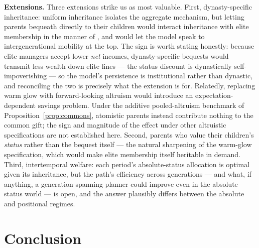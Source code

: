 \documentclass[12pt,letterpaper]{article}
\theoremstyle{definition}
\begin{document}
\textbf{Extensions.}
Three extensions strike us as most valuable.
First, dynasty-specific inheritance: uniform inheritance isolates the aggregate mechanism, but letting parents bequeath directly to their children would interact inheritance with elite membership in the manner of \citet{galorzeira1993}, and would let the model speak to intergenerational mobility at the top.
The sign is worth stating honestly: because elite managers accept lower \emph{net} incomes, dynasty-specific bequests would transmit less wealth down elite lines --- the status discount is dynastically self-impoverishing --- so the model's persistence is institutional rather than dynastic, and reconciling the two is precisely what the extension is for.
Relatedly, replacing warm glow with forward-looking altruism would introduce an expectation-dependent savings problem.
Under the additive pooled-altruism benchmark of Proposition~\ref{prop:commons}, atomistic parents instead contribute nothing to the common gift; the sign and magnitude of the effect under other altruistic specifications are not established here.
Second, parents who value their children's \emph{status} rather than the bequest itself --- the natural sharpening of the warm-glow specification, which would make elite membership itself heritable in demand.
Third, intertemporal welfare: each period's absolute-status allocation is optimal given its inheritance, but the path's efficiency across generations --- and what, if anything, a generation-spanning planner could improve even in the absolute-status world --- is open, and the answer plausibly differs between the absolute and positional regimes.

\section{Conclusion}\label{sec:conclusion}
\end{document}
